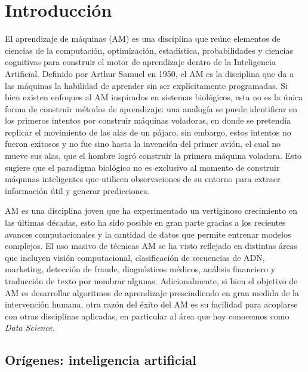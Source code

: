 

\section{Introducción}
\label{cap:intro}


El aprendizaje de máquinas (AM) es una disciplina que reúne elementos de ciencias de la computación, optimización, estadística, probabilidades y ciencias cognitivas para construir el motor de aprendizaje dentro de la Inteligencia Artificial. Definido por Arthur Samuel en 1950, el AM es la disciplina que da a las máquinas la habilidad de aprender sin ser explícitamente programadas. Si bien existen enfoques al AM inspirados en sistemas biológicos, esta no es la única forma de construir métodos de aprendizaje: una analogía se puede identificar en los primeros intentos por construir máquinas voladoras, en donde se pretendía replicar el movimiento de las alas de un pájaro, sin embargo, estos intentos no fueron exitosos y no fue sino hasta la invención del primer avión, el cual no mueve sus alas, que el hombre logró construir la primera máquina voladora. Esto sugiere que el paradigma biológico no es exclusivo al momento de construir máquinas inteligentes que utilicen observaciones de su entorno para extraer información útil y generar predicciones. 


AM es una disciplina joven que ha experimentado un vertiginoso crecimiento en las últimas décadas, esto ha sido posible en gran parte gracias a los recientes avances computacionales y la cantidad de datos que permite entrenar modelos complejos. El uso masivo de técnicas AM se ha visto reflejado en distintas áreas que incluyen visión computacional, clasificación de secuencias de ADN, marketing, detección de fraude, diagnósticos médicos, análisis financiero y traducción de texto por nombrar algunas. Adicionalmente, si bien el objetivo de AM es desarrollar algoritmos de aprendizaje prescindiendo en gran medida de la intervención humana,  otra razón del éxito del AM es su facilidad para acoplarse con otras disciplinas aplicadas, en particular al área que hoy conocemos como \textit{Data Science}. 

\subsection{Orígenes: inteligencia artificial}

